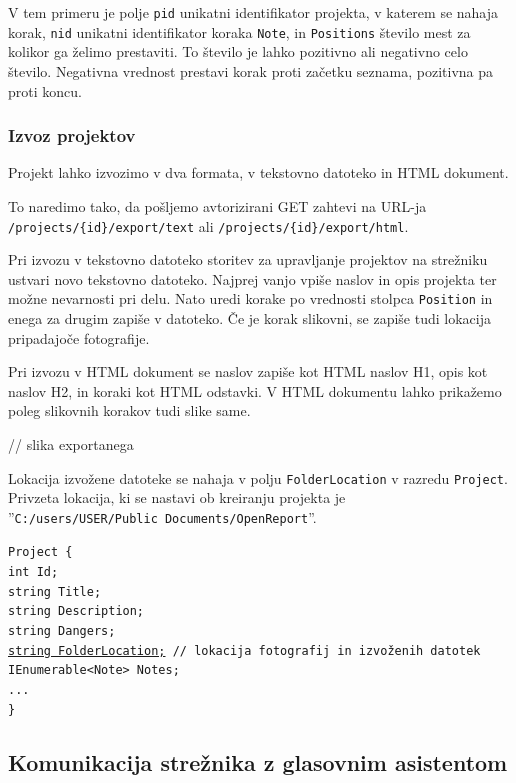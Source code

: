 \documentclass[a4paper, 12pt]{book}
\begin{document}
V tem primeru je polje \texttt{pid} unikatni identifikator projekta, v katerem se nahaja korak, \texttt{nid} unikatni identifikator koraka \texttt{Note}, in \texttt{Positions} število mest za kolikor ga želimo prestaviti.
To število je lahko pozitivno ali negativno celo število.
Negativna vrednost prestavi korak proti začetku seznama, pozitivna pa proti koncu.

\subsubsection{Izvoz projektov}

Projekt lahko izvozimo v dva formata, v tekstovno datoteko in HTML dokument.

To naredimo tako, da pošljemo avtorizirani GET zahtevi na URL-ja \texttt{/projects/\{id\}/export/text} ali \texttt{/projects/\{id\}/export/html}.

Pri izvozu v tekstovno datoteko storitev za upravljanje projektov na strežniku ustvari novo tekstovno datoteko.
Najprej vanjo vpiše naslov in opis projekta ter možne nevarnosti pri delu.
Nato uredi korake po vrednosti stolpca \texttt{Position} in enega za drugim zapiše v datoteko.
Če je korak slikovni, se zapiše tudi lokacija pripadajoče fotografije.

Pri izvozu v HTML dokument se naslov zapiše kot HTML naslov H1, opis kot naslov H2, in koraki kot HTML odstavki.
V HTML dokumentu lahko prikažemo poleg slikovnih korakov tudi slike same.

// slika exportanega 

Lokacija izvožene datoteke se nahaja v polju \texttt{FolderLocation} v razredu \texttt{Project}.
Privzeta lokacija, ki se nastavi ob kreiranju projekta je 
\\''\texttt{C:/users/USER/Public Documents/OpenReport}''.

\noindent \texttt{Project \{ \\
int Id; \\
string Title; \\
string Description; \\
string Dangers; \\
\underline{string FolderLocation;} // lokacija fotografij in izvoženih datotek \\
IEnumerable<Note> Notes; \\
... \\
\}
}

\subsection{Komunikacija strežnika z glasovnim asistentom}
\end{document}
